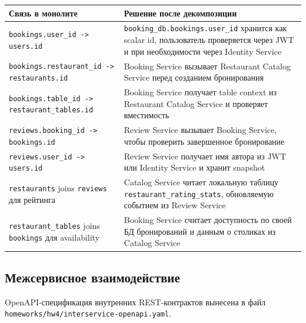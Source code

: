 \documentclass[14pt,a4paper]{extarticle}
\newcommand{\code}[1]{\texttt{#1}}
\begin{document}
\begin{longtable}{|L{0.38\textwidth}|L{0.52\textwidth}|}
\hline
\textbf{Связь в монолите} & \textbf{Решение после декомпозиции} \\
\hline
\code{bookings.user\_id -> users.id} & \code{booking\_db.bookings.user\_id} хранится как scalar id, пользователь проверяется через JWT и при необходимости через Identity Service \\
\hline
\code{bookings.restaurant\_id -> restaurants.id} & Booking Service вызывает Restaurant Catalog Service перед созданием бронирования \\
\hline
\code{bookings.table\_id -> restaurant\_tables.id} & Booking Service получает table context из Restaurant Catalog Service и проверяет вместимость \\
\hline
\code{reviews.booking\_id -> bookings.id} & Review Service вызывает Booking Service, чтобы проверить завершенное бронирование \\
\hline
\code{reviews.user\_id -> users.id} & Review Service получает имя автора из JWT или Identity Service и хранит snapshot \\
\hline
\code{restaurants} joins \code{reviews} для рейтинга & Catalog Service читает локальную таблицу \code{restaurant\_rating\_stats}, обновляемую событием из Review Service \\
\hline
\code{restaurant\_tables} joins \code{bookings} для availability & Booking Service считает доступность по своей БД бронирований и данным о столиках из Catalog Service \\
\hline
\end{longtable}

\subsection{Межсервисное взаимодействие}

OpenAPI-спецификация внутренних REST-контрактов вынесена в файл \code{homeworks/hw4/interservice-openapi.yaml}.
\end{document}
